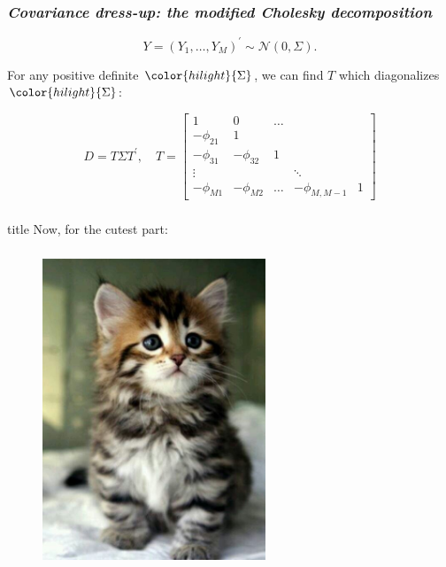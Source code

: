 \documentclass[12pt]{beamer}
\newcommand{\newthought}[1]{{\small \color{hilight} {#1}}}
\newcommand\myfootnote[1]{%
  \begingroup
  \renewcommand\thefootnote{}\footnote{#1}%
  \addtocounter{footnote}{-1}%
  \endgroup
}
\begin{document}

\begin{frame}
\frametitle{\emph{Covariance dress-up: the modified Cholesky decomposition}}

\begin{equation*}
Y = \left(Y_1, \dots, Y_M \right)^\prime \sim \mathcal{N}\left(0,\Sigma\right).
\end{equation*}

\newthought{For any positive definite} $\color{hilight}{\Sigma}$, \newthought{we can find $T$ which diagonalizes} $\color{hilight}{\Sigma}$:

\begin{equation*}
D = T \Sigma T^\prime, \quad T = \begin{bmatrix} 1 & 0 & \dots & & \\ -\phi_{21} & 1 & & & \\ -\phi_{31}& -\phi_{32} &  1 & & \\ \vdots & & & \ddots & \\ -\phi_{M1} &-\phi_{M2} & \dots & -\phi_{M,M-1}& 1  \end{bmatrix}
\end{equation*}
\end{frame}




\begin{frame}
\frametitle{}

\vfill
  \begin{beamercolorbox}[center]{title}
\Large Now, for the cutest part:
  \end{beamercolorbox}
  \vfill

\end{frame}




\begin{frame}
\frametitle{}
\begin{figure}
\graphicspath{{img/}}
  \includegraphics[height=9cm]{cutest-kitten-ever}
\end{figure}

\end{frame}
\end{document}
